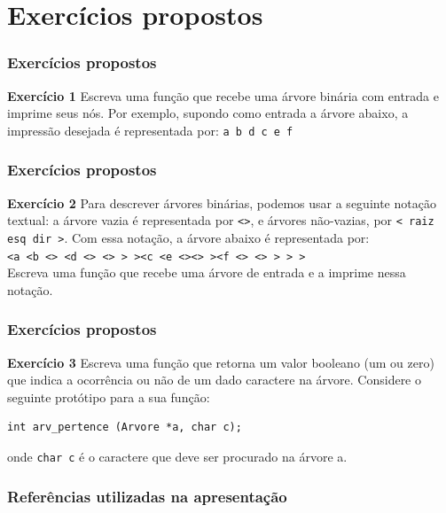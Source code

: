 \documentclass{beamer}
\begin{document}
\section{Exercícios propostos}

\begin{frame}
  \frametitle{Exercícios propostos}

  \textbf{Exercício 1} Escreva uma função que recebe uma árvore binária
  com entrada e imprime seus nós. Por exemplo, supondo como
  entrada a árvore abaixo, a impressão desejada é representada por:
  \texttt{a b d c e f}

  \centering

\end{frame}

\begin{frame}
  \frametitle{Exercícios propostos}

    \textbf{Exercício 2} Para descrever árvores binárias, podemos usar a seguinte notação textual: 
    a árvore vazia é representada por \texttt{<>}, e árvores não-vazias, por 
    \texttt{< raiz esq dir >}. Com essa notação, a árvore abaixo é representada por:\\
    \texttt{<a <b <> <d <> <> > ><c <e <><> ><f <> <> > > >}\\
    Escreva uma função que recebe uma árvore de entrada e a imprime nessa notação.

  \centering

\end{frame}

\begin{frame}[fragile]
  \frametitle{Exercícios propostos}

  \textbf{Exercício 3} Escreva uma função que retorna um valor booleano (um ou zero) que indica a 
  ocorrência ou não de um dado caractere na árvore. Considere o seguinte protótipo para
  a sua função:

  \begin{verbatim}
int arv_pertence (Arvore *a, char c);
  \end{verbatim}

  onde \texttt{char c} é o caractere que deve ser procurado na árvore a.

\end{frame}

\begin{frame}[allowframebreaks]
  \frametitle{Referências utilizadas na apresentação}
  
\end{frame}
\end{document}
